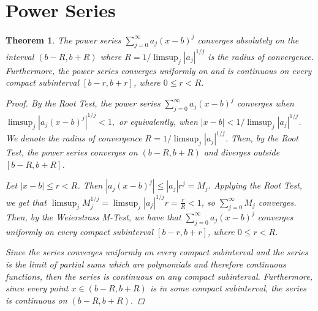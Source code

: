 \documentclass[12pt, letterpaper]{article}
\newtheorem{thm}{Theorem}[section]
\theoremstyle{definition}
\begin{document}
\section{Power Series}
\begin{thm}
  The power series $\sum_{j=0}^\infty a_j (x-b)^j$ converges absolutely on
  the interval $(b-R, b+R)$ where $R = 1 / \limsup_j |a_j|^{1/j}$ is
  the radius of convergence.
  Furthermore, the power series converges uniformly on and is continuous
  on every compact subinterval $[b-r, b+r]$, where $0 \le r < R$.

  \begin{proof}
    By the Root Test, the power series $\sum_{j=0}^\infty a_j (x-b)^j$ converges when
    $\limsup_j |a_j (x-b)^j|^{1/j} < 1,$
    or equivalently, when $|x-b| < 1 / \limsup_j |a_j|^{1/j}$.
    We denote the radius of convergence $R = 1 / \limsup_j |a_j|^{1/j}$.
    Then, by the Root Test, the power series converges on $(b-R, b+R)$ and diverges outside
    $[b-R, b+R]$.

    Let $|x-b| \le r < R$.
    Then $|a_j (x-b)^j| \le |a_j|r^j = M_j$.
    Applying the Root Test, we get that
    $\limsup_j M_j^{1/j} = \limsup_j |a_j|^{1/j}r = \frac{r}{R} < 1$,
    so $\sum_{j=0}^\infty M_j$ converges.
    Then, by the Weierstrass M-Test, we have that $\sum_{j=0}^\infty a_j (x-b)^j$ converges
    uniformly on every compact subinterval $[b-r, b+r]$, where $0 \le r < R$.

    Since the series converges uniformly on every compact subinterval
    and the series is the limit of partial sums which are polynomials and therefore
    continuous functions, then the series is continuous on any compact subinterval.
    Furthermore, since every point $x \in (b-R, b+R)$ is in
    some compact subinterval, the series is continuous on $(b-R, b+R)$.
  \end{proof}
\end{thm}
\end{document}
